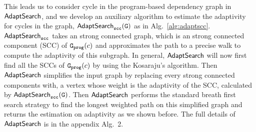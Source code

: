  This leads us to consider cycle in the program-based dependency graph in $\mathsf{AdaptSearch}$, and we develop an auxiliary algorithm to estimate the adaptivity for cycles in the graph, $\mathtt{\mathsf{AdaptSearch}_{scc}(G)}$ as in Alg.~\ref{alg:adaptscc}.
 $\mathtt{\mathsf{AdaptSearch}_{scc}}$ takes an strong connected graph, which is an strong connected component (SCC) of $\mathtt{{G_{prog}}}(c)$
 and approximates the
 path to a precise walk to compute the adaptivity of this subgraph. 
 In general, $\mathsf{AdaptSearch}$ will now first find all the SCCs of $\mathtt{{G_{prog}}}(c)$ by using the Kosaraju’s algorithm\cite{sharirM81}.  
 Then $\mathsf{AdaptSearch}$ simplifies  the input graph by replacing every strong connected components with, a vertex whose weight is the adaptivity of the SCC, calculated by $\mathtt{\mathsf{AdaptSearch}_{scc}(G)}$. Then $\mathsf{AdaptSearch}$ performs
      the standard breath first search strategy to find the longest weighted path on this simplified graph and returns the estimation on adaptivity as we shown before.
      The full details of $\mathsf{AdaptSearch}$ is in the appendix Alg.~2.
